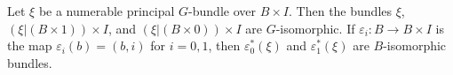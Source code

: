 Let $\xi$ be a numerable principal $G$-bundle over $B \times I$. Then the bundles $\xi$, $(\xi|(B \times 1)) \times I$, and $(\xi|(B \times 0)) \times I$ are $G$-isomorphic. If $\varepsilon_i: B \rightarrow B \times I$ is the map $\varepsilon_i(b) = (b, i)$ for $i = 0, 1$, then $\varepsilon_0^*(\xi)$ and $\varepsilon_1^*(\xi)$ are $B$-isomorphic bundles.
